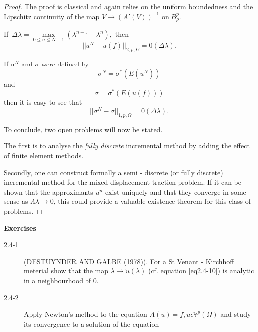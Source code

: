 \begin{proof}
  The proof is classical and again relies on the uniform boundedness
  and the Lipschitz continuity of the map $V \rightarrow (A'(V))^{-1}$
  on $B^p_\rho$. 

If\ $\Delta \lambda = \max\limits_{0 \le n \le
      N-1} (\lambda^{n+1}-\lambda^n)$,\ then 
\begin{equation*}
|| u^N -u(f)||_{2, p, \Omega} =
   0(\Delta \lambda). \tag{2.4-13}\label{eq2.4-13} 
   \end{equation*}

If $\sigma^N$ and $\sigma$ were defined by
\begin{equation*}
  \sigma^N = \sigma^* (E(u^N)) \tag{2.4-14}\label{eq2.4-14}
\end{equation*}
and
\begin{equation*}
\sigma = \sigma^* (E(u(f))) \tag{2.4-15}\label{eq2.4-15}
\end{equation*}
then it is easy to see that 
\begin{equation*}
|| \sigma^N -\sigma||_{1, p, \Omega} =
   0(\Delta \lambda). \tag{2.4-16}\label{eq2.4-16} 
\end{equation*}

To conclude, two open problems will now be stated.

The first is to analyse the {\em fully discrete} incremental method by
add\-ing the effect of finite element methods. 

Secondly, one can construct formally a semi - discrete (or fully
discrete) incremental method for the mixed displacement-traction
problem. If it can be shown that the approximants $u^n$ exist uniquely
and that they converge in some sense as $\Lambda \lambda \rightarrow
0$, this could provide a valuable existence theorem for this class of
problems. 
\end{proof}

\medskip
\begin{center}
{\large\bf  Exercises}\pageoriginale
\end{center}

\begin{description}
\item[2.4-1] (DESTUYNDER AND GALBE (1978)). For a St Venant -
  Kirchhoff meterial show that the map $\lambda \rightarrow
  \tilde{u}(\lambda)$ (cf. equation \eqref{eq2.4-10}) is analytic in a
  neighbourhood of $0$.  

\item[2.4-2] Apply Newton's method to the equation $A(u) = f, u
  \epsilon \mathbb{V}^p (\Omega)$ and study its convergence to a
  solution of the equation 
\end{description}
 
